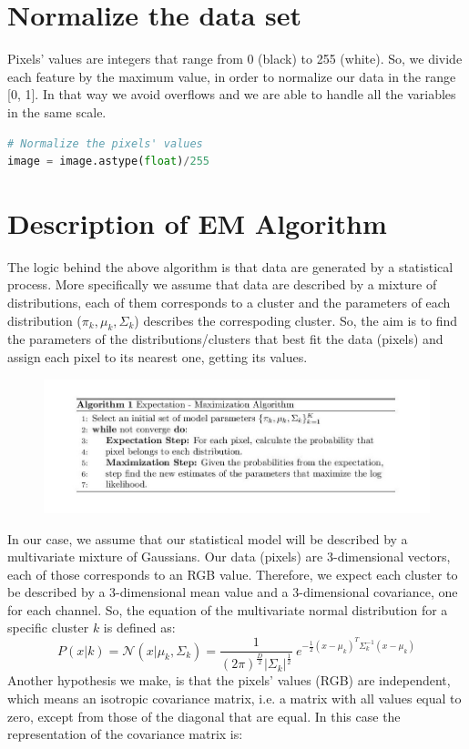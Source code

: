 \documentclass[11pt]{article}
\begin{document}
\section{Normalize the data set }
Pixels' values are integers that range from 0 (black) to 255 (white). So, we divide each feature by the maximum value, in order to normalize our data in the range [0, 1]. In that way we avoid overflows and we are able to handle all the variables in the same scale. 

\begin{lstlisting}[language = Python]
# Normalize the pixels' values
image = image.astype(float)/255
\end{lstlisting}

\newpage
\section{Description of EM Algorithm}
The logic behind the above algorithm is that data are generated by a statistical process. More specifically we assume that data are described by a mixture of distributions, each of them corresponds to a cluster and the parameters of each distribution ($\pi_{k}, \mu_{k}, \Sigma_{k}$) describes the correspoding cluster. So, the aim is to find the parameters of the distributions/clusters that best fit the data (pixels) and assign each pixel to its nearest one, getting its values. 
	\begin{figure}[H]
		\centering
		\includegraphics[width=\textwidth]{../images/EM_algorithm.jpg}
	\end{figure}

\noindent In our case, we assume that our statistical model will be described by a multivariate mixture of Gaussians. Our data (pixels) are 3-dimensional vectors, each of those corresponds to an RGB value. Therefore, we expect each cluster to be described by a 3-dimensional mean value and a 3-dimensional covariance, one for each channel. So, the equation of the multivariate normal distribution for a specific cluster $k$ is defined as: 
\newline
$$ 
P(x|k) =  \mathcal{N} (x|\mu_{k}, \Sigma_{k}) = \frac{1}{(2 \pi)^{\frac{D}{2}}|\Sigma_k|^{\frac{1}{2}}}\
e^{-\frac{1}{2} (x-\mu_k)^T \Sigma_k^{-1}(x-\mu_k)} 
$$  
\newline
\noindent Another hypothesis we make, is that the pixels' values (RGB) are independent, which means an isotropic covariance matrix, i.e. a matrix with all values equal to zero, except from those of the diagonal that are equal. In this case the representation of the covariance matrix is: 
\end{document}
